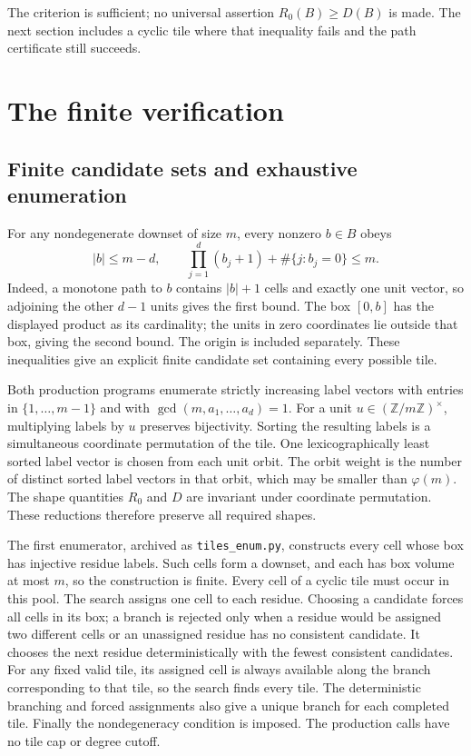 \documentclass[11pt]{article}
\theoremstyle{definition}
\theoremstyle{remark}
\newcommand{\Z}{\mathbb{Z}}
\begin{document}
The criterion is sufficient; no universal assertion $R_0(B)\ge D(B)$
is made. The next section includes a cyclic tile where that inequality
fails and the path certificate still succeeds.

\section{The finite verification}

\subsection{Finite candidate sets and exhaustive enumeration}

For any nondegenerate downset of size $m$, every nonzero $b\in B$ obeys
\begin{equation}\label{eq:candidates}
|b|\le m-d,\qquad
\prod_{j=1}^d(b_j+1)+\#\{j:b_j=0\}\le m.
\end{equation}
Indeed, a monotone path to $b$ contains $|b|+1$ cells and exactly one
unit vector, so adjoining the other $d-1$ units gives the first bound.
The box $[0,b]$ has the displayed product as its cardinality; the units
in zero coordinates lie outside that box, giving the second bound.
The origin is included separately. These inequalities give an explicit
finite candidate set containing every possible tile.

Both production programs enumerate strictly increasing label vectors
with entries in $\{1,\ldots,m-1\}$ and with
$\gcd(m,a_1,\ldots,a_d)=1$. For a unit
$u\in(\Z/m\Z)^\times$, multiplying labels by $u$ preserves bijectivity.
Sorting the resulting labels is a simultaneous coordinate permutation
of the tile. One lexicographically least sorted label vector is chosen
from each unit orbit. The orbit weight is the number of distinct sorted
label vectors in that orbit, which may be smaller than $\varphi(m)$.
The shape quantities $R_0$ and $D$ are invariant under coordinate
permutation. These reductions therefore preserve all required shapes.

The first enumerator, archived as \texttt{tiles\_enum.py}, constructs
every cell whose box has injective residue labels. Such cells form a
downset, and each has box volume at most $m$, so the construction is
finite. Every cell of a cyclic tile must occur in this pool.
The search assigns one cell to each residue. Choosing a candidate forces
all cells in its box; a branch is rejected only when a residue would be
assigned two different cells or an unassigned residue has no consistent
candidate. It chooses the next residue deterministically with the fewest
consistent candidates. For any fixed valid tile, its assigned cell is
always available along the branch corresponding to that tile, so the
search finds every tile. The deterministic branching and forced
assignments also give a unique branch for each completed tile. Finally
the nondegeneracy condition is imposed. The production calls have no
tile cap or degree cutoff.
\end{document}
